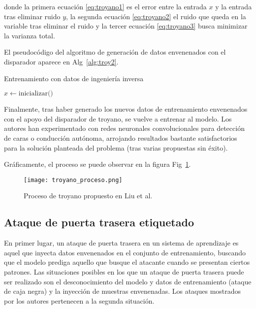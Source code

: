 donde la primera ecuación \ref{eq:troyano1} es el error entre la entrada $x$ y la entrada tras eliminar ruido $y$, la segunda ecuación \ref{eq:troyano2} el ruido que queda en la variable tras eliminar el ruido y la tercer ecuación \ref{eq:troyano3} busca minimizar la varianza total.

El pseudocódigo del algoritmo de generación de datos envenenados con el disparador aparece en Alg~\ref{alg:troy2}.

\begin{algorithm}
\caption{Entrenamiento con datos de ingeniería inversa}\label{alg:troy2}
\BlankLine
$x \leftarrow \text{inicializar()}$\;
\end{algorithm}

Finalmente, tras haber generado los nuevos datos de entrenamiento envenenados con el apoyo del disparador de troyano, se vuelve a entrenar al modelo. Los autores han experimentado con redes neuronales convolucionales para detección de caras o conducción autónoma, arrojando resultados bastante satisfactorios para la solución planteada del problema (tras varias propuestas sin éxito).

Gráficamente, el proceso se puede observar en la figura Fig~\ref{fig:troyano_proceso}.

\begin{figure}[h]
    \centering
    \texttt{[image: troyano\_proceso.png]}
    \caption{Proceso de troyano propuesto en Liu et al.\cite{TroyanoCausativo}}
    \label{fig:troyano_proceso}
\end{figure}

\subsection*{Ataque de puerta trasera etiquetado}

En primer lugar, un ataque de puerta trasera en un sistema de aprendizaje es aquel que inyecta datos envenenados en el conjunto de entrenamiento, buscando que el modelo prediga aquello que busque el atacante cuando se presentan ciertos patrones. Las situaciones posibles en los que un ataque de puerta trasera puede ser realizado son el desconocimiento del modelo y datos de entrenamiento (ataque de caja negra) y la inyección de muestras envenenadas. Los ataques mostrados por los autores pertenecen a la segunda situación.

